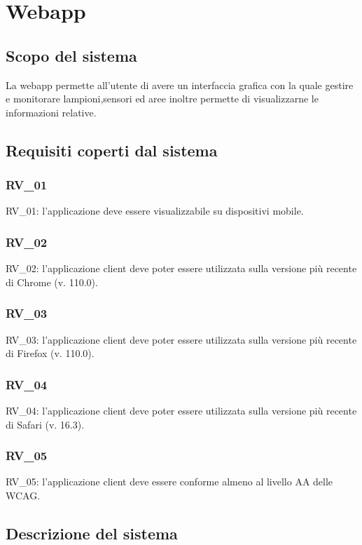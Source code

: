\chapter{Webapp}\label{cap:webapp}

\section{Scopo del sistema}

La webapp permette all'utente di avere un interfaccia grafica con la quale gestire e monitorare lampioni,sensori ed aree inoltre permette di visualizzarne le informazioni relative.

\section{Requisiti coperti dal sistema}

\subsection{RV\_01}
RV\_01: l'applicazione deve essere visualizzabile su dispositivi mobile.

\subsection{RV\_02}
RV\_02: l'applicazione client deve poter essere utilizzata sulla versione più recente di Chrome (v. 110.0).

\subsection{RV\_03}
RV\_03: l'applicazione client deve poter essere utilizzata sulla versione più recente di Firefox (v. 110.0).

\subsection{RV\_04}
RV\_04: l'applicazione client deve poter essere utilizzata sulla versione più recente di Safari (v. 16.3).

\subsection{RV\_05}
RV\_05: l'applicazione client deve essere conforme almeno al livello AA delle WCAG.


\section{Descrizione del sistema}